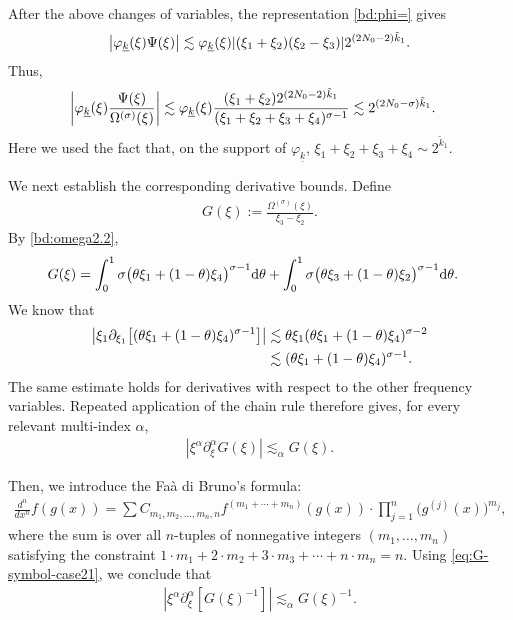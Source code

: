 \documentclass[UTF-8,reqno]{amsart}
\numberwithin{equation}{section}
\theoremstyle{definition}
\def\dif{{\mathord{{\rm d}}}}
\def\dif{{\mathord{{\rm d}}}}
\begin{document}
After the above changes of variables, the representation
\eqref{bd:phi=} gives
\begin{align}
\left|
\varphi_{\underline{k}}(\xi)\Psi(\xi)
\right|
\lesssim
\varphi_{\underline{k}}(\xi)
|(\xi_1+\xi_2)(\xi_2-\xi_3)|
2^{(2N_0-2)\tilde{k}_1}.\notag
\end{align}  Thus,
\begin{align}
\left|
\varphi_{\underline{k}}(\xi)
\frac{\Psi(\xi)}{\Omega^{(\sigma)}(\xi)}
\right|
&\lesssim
\varphi_{\underline{k}}(\xi)
\frac{
(\xi_1+\xi_2)
2^{(2N_0-2)\tilde{k}_1}
}{
(\xi_1+\xi_2+\xi_3+\xi_4)^{\sigma-1}
} \lesssim
2^{(2N_0-\sigma)\tilde{k}_1}.\notag
\end{align}
Here we used the fact that, on the support of
$\varphi_{\underline{k}}$, $ \xi_1+\xi_2+\xi_3+\xi_4
    \sim 2^{\tilde{k}_1}.$ 

We next establish the corresponding derivative bounds. Define
\begin{align*}
G(\xi)
:=
\frac{\Omega^{(\sigma)}(\xi)}{\xi_3-\xi_2}.
\end{align*}
By \eqref{bd:omega2.2},
\begin{align*}
G(\xi)
&=
\int_0^1
\sigma\bigl(\theta\xi_1+(1-\theta)\xi_4\bigr)^{\sigma-1}
\dif\theta +
\int_0^1
\sigma\bigl(\theta\xi_3+(1-\theta)\xi_2\bigr)^{\sigma-1}
\dif\theta.
\end{align*} We know that
\begin{align}
\left|
\xi_1\partial_{\xi_1}
\bigl[
(\theta\xi_1+(1-\theta)\xi_4)^{\sigma-1}
\bigr]
\right|
&\lesssim
\theta\xi_1
(\theta\xi_1+(1-\theta)\xi_4)^{\sigma-2}
\notag\\
&\lesssim
(\theta\xi_1+(1-\theta)\xi_4)^{\sigma-1}.\notag
\end{align}
The same estimate holds for derivatives with respect to the other
frequency variables. Repeated application of the chain rule therefore
gives, for every relevant multi-index $\alpha$,
\begin{align}
\left|
\xi^\alpha\partial_\xi^\alpha G(\xi)
\right|
\lesssim_\alpha G(\xi).
\label{eq:G-symbol-case21}
\end{align}

 Then, we introduce the Fa\`a di Bruno's formula:
\begin{align*}
    \frac{d^n}{dx^n} f(g(x)) = \sum C_{m_1,m_2,...,m_n,n} f^{(m_1 + \cdots + m_n)}(g(x)) \cdot \prod_{j=1}^{n} \bigl(g^{(j)}(x)\bigr)^{m_j},
\end{align*}
where the sum is over all $n$-tuples of nonnegative integers 
$(m_{1},\ldots ,m_{n})$ satisfying the constraint
$1\cdot m_{1}+2\cdot m_{2}+3\cdot m_{3}+\cdots +n\cdot m_{n}=n.$ 
Using \eqref{eq:G-symbol-case21}, we conclude that
\begin{align}
\left|
\xi^\alpha\partial_\xi^\alpha
\left[
G(\xi)^{-1}
\right]
\right|
\lesssim_\alpha
G(\xi)^{-1}.
\label{eq:G-inverse-symbol-case21}
\end{align}
\end{document}
